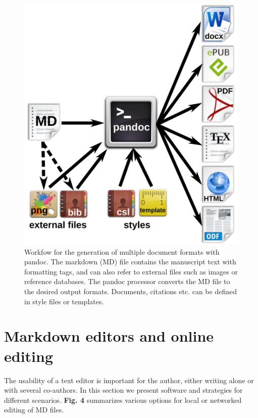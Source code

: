 \documentclass[10pt,fleqn]{wlpeerj}
\begin{document}
\begin{figure}[htbp]
\centering
\includegraphics{Fig3.png}
\caption{Workfow for the generation of multiple document formats with
pandoc. The markdown (MD) file contains the manuscript text with
formatting tags, and can also refer to external files such as images or
reference databases. The pandoc processor converts the MD file to the
desired output formats. Documents, citations etc. can be defined in
style files or templates.}
\end{figure}

\section{Markdown editors and online
editing}\label{markdown-editors-and-online-editing}

The usability of a text editor is important for the author, either
writing alone or with several co-authors. In this section we present
software and strategies for different scenarios. \textbf{Fig. 4}
summarizes various options for local or networked editing of MD files.
\end{document}
